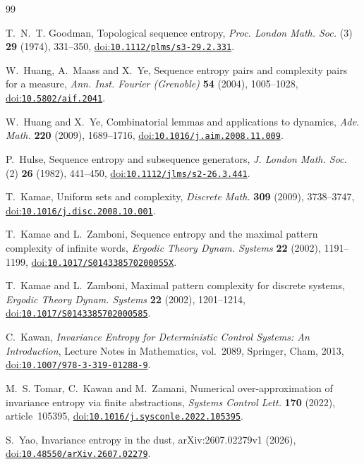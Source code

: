 \documentclass[11pt,reqno]{amsart}
\numberwithin{equation}{section}
\theoremstyle{definition}
\newcommand{\doi}[1]{\href{https://doi.org/#1}{doi:\nolinkurl{#1}}}
\begin{document}
\begin{thebibliography}{99}

T.~N.~T. Goodman,
Topological sequence entropy,
\emph{Proc. London Math. Soc.} (3) \textbf{29} (1974), 331--350,
\doi{10.1112/plms/s3-29.2.331}.

W.~Huang, A.~Maass and X.~Ye,
Sequence entropy pairs and complexity pairs for a measure,
\emph{Ann. Inst. Fourier (Grenoble)} \textbf{54} (2004), 1005--1028,
\doi{10.5802/aif.2041}.

W.~Huang and X.~Ye,
Combinatorial lemmas and applications to dynamics,
\emph{Adv. Math.} \textbf{220} (2009), 1689--1716,
\doi{10.1016/j.aim.2008.11.009}.

P.~Hulse,
Sequence entropy and subsequence generators,
\emph{J. London Math. Soc.} (2) \textbf{26} (1982), 441--450,
\doi{10.1112/jlms/s2-26.3.441}.

T.~Kamae,
Uniform sets and complexity,
\emph{Discrete Math.} \textbf{309} (2009), 3738--3747,
\doi{10.1016/j.disc.2008.10.001}.

T.~Kamae and L.~Zamboni,
Sequence entropy and the maximal pattern complexity of infinite words,
\emph{Ergodic Theory Dynam. Systems} \textbf{22} (2002), 1191--1199,
\doi{10.1017/S014338570200055X}.

T.~Kamae and L.~Zamboni,
Maximal pattern complexity for discrete systems,
\emph{Ergodic Theory Dynam. Systems} \textbf{22} (2002), 1201--1214,
\doi{10.1017/S0143385702000585}.

C.~Kawan,
\emph{Invariance Entropy for Deterministic Control Systems: An Introduction},
Lecture Notes in Mathematics, vol.~2089, Springer, Cham, 2013,
\doi{10.1007/978-3-319-01288-9}.

M.~S. Tomar, C.~Kawan and M.~Zamani,
Numerical over-approximation of invariance entropy via finite abstractions,
\emph{Systems Control Lett.} \textbf{170} (2022), article~105395,
\doi{10.1016/j.sysconle.2022.105395}.

S.~Yao,
Invariance entropy in the dust,
arXiv:2607.02279v1 (2026),
\doi{10.48550/arXiv.2607.02279}.

\end{thebibliography}
\end{document}
